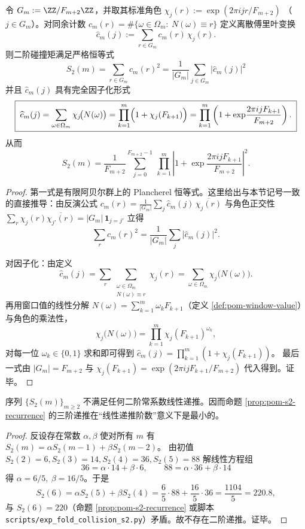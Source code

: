 \begin{proposition}\label{prop:pom-s2-plancherel}
令 \(G_m:=\ZZ/F_{m+2}\ZZ\)，并取其标准角色
\(
\chi_j(r):=\exp(2\pi i jr/F_{m+2})
\)
（\(j\in G_m\)）。对同余计数 \(c_m(r)=\#\{\omega\in\Omega_m:\ N(\omega)\equiv r\}\) 定义离散傅里叶变换
\[
\widehat c_m(j):=\sum_{r\in G_m} c_m(r)\,\chi_j(r).
\]
则二阶碰撞矩满足严格恒等式
\[
\boxed{\;
S_2(m)=\sum_{r\in G_m}c_m(r)^2=\frac{1}{|G_m|}\sum_{j\in G_m}\bigl|\widehat c_m(j)\bigr|^2\;}
\]
并且 \(\widehat c_m(j)\) 具有完全因子化形式
\[
\boxed{\;
\widehat c_m(j)=\sum_{\omega\in\Omega_m}\chi_j\!\bigl(N(\omega)\bigr)
=\prod_{k=1}^m\Bigl(1+\chi_j(F_{k+1})\Bigr)
=\prod_{k=1}^m\left(1+\exp\!\frac{2\pi i j F_{k+1}}{F_{m+2}}\right).\;}
\]
从而
\[
S_2(m)
=\frac{1}{F_{m+2}}\sum_{j=0}^{F_{m+2}-1}\ \prod_{k=1}^m\left|1+\exp\!\frac{2\pi i j F_{k+1}}{F_{m+2}}\right|^2.
\]
\end{proposition}
\begin{proof}
第一式是有限阿贝尔群上的 Plancherel 恒等式。这里给出与本节记号一致的直接推导：由反演公式
\(
c_m(r)=\frac{1}{|G_m|}\sum_{j}\widehat c_m(j)\,\overline{\chi_j(r)}
\)
与角色正交性
\(
\sum_{r}\chi_j(r)\overline{\chi_{j'}(r)}=|G_m|\,\mathbf{1}_{j=j'}
\)
立得
\[
\sum_{r}c_m(r)^2
=\frac{1}{|G_m|}\sum_{j}|\widehat c_m(j)|^2.
\]

对因子化：由定义
\[
\widehat c_m(j)
=\sum_{r}\sum_{\substack{\omega\in\Omega_m\\N(\omega)\equiv r}}\chi_j(r)
=\sum_{\omega\in\Omega_m}\chi_j\!\bigl(N(\omega)\bigr).
\]
再用窗口值的线性分解 \(N(\omega)=\sum_{k=1}^m \omega_k F_{k+1}\)（定义 \ref{def:pom-window-value}）与角色的乘法性，
\[
\chi_j\!\bigl(N(\omega)\bigr)
=\prod_{k=1}^m \chi_j(F_{k+1})^{\omega_k},
\]
对每一位 \(\omega_k\in\{0,1\}\) 求和即可得到
\(
\widehat c_m(j)=\prod_{k=1}^m(1+\chi_j(F_{k+1}))
\)。
最后一式由 \(|G_m|=F_{m+2}\) 与 \(\chi_j(F_{k+1})=\exp(2\pi i jF_{k+1}/F_{m+2})\) 代入得到。证毕。
\end{proof}

\begin{lemma}[三阶递推的最小性]\label{lem:pom-s2-minimal-order}
序列 \(\{S_2(m)\}_{m\ge 2}\) 不满足任何二阶常系数线性递推。因而命题 \ref{prop:pom-s2-recurrence} 的三阶递推在“线性递推阶数”意义下是最小的。
\end{lemma}
\begin{proof}
反设存在常数 \(\alpha,\beta\) 使对所有 \(m\) 有 \(S_2(m)=\alpha S_2(m-1)+\beta S_2(m-2)\)。
由初值 \(S_2(2)=6,S_2(3)=14,S_2(4)=36,S_2(5)=88\) 解线性方程组
$$
36=\alpha\cdot 14+\beta\cdot 6,\qquad
88=\alpha\cdot 36+\beta\cdot 14
$$
得 \(\alpha=6/5,\ \beta=16/5\)。于是
$$
S_2(6)=\alpha S_2(5)+\beta S_2(4)=\frac65\cdot 88+\frac{16}{5}\cdot 36=\frac{1104}{5}=220.8,
$$
与 \(S_2(6)=220\)（命题 \ref{prop:pom-s2-recurrence} 或脚本 \texttt{scripts/exp\_fold\_collision\_s2.py}）矛盾。故不存在二阶递推。证毕。
\end{proof}

